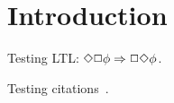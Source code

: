 
\section{Introduction}
\label{sec:introduction}


Testing LTL: $\Diamond\Box\phi \Rightarrow \Box\Diamond\phi$.

Testing citations~\cite{Engelhardt2013, MannaPnueli1991:szym,
  HoangAbrial:ICFEM2011, MannaPnueli92, MannaPnueli:REX1988}.
